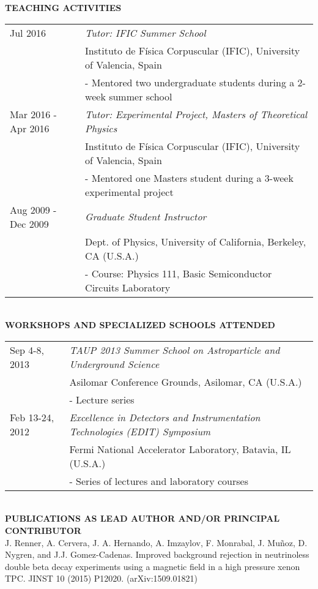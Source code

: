 \newpage
{\noindent\textbf{TEACHING ACTIVITIES}}\\

\begin{tabular}{ll}
	
	Jul 2016 & \emph{Tutor: IFIC Summer School}\\
	& Instituto de F\'{i}sica Corpuscular (IFIC), University of Valencia, Spain\\
	& - Mentored two undergraduate students during a 2-week summer school\\
	
	Mar 2016 - Apr 2016 & \emph{Tutor: Experimental Project, Masters of Theoretical Physics}\\
	& Instituto de F\'{i}sica Corpuscular (IFIC), University of Valencia, Spain\\
	& - Mentored one Masters student during a 3-week experimental project\\
		
	Aug 2009 - Dec 2009 & \emph{Graduate Student Instructor}\\
	& Dept. of Physics, University of California, Berkeley, CA (U.S.A.)\\
	& - Course: Physics 111, Basic Semiconductor Circuits Laboratory\\
\end{tabular}\\

{\noindent\textbf{WORKSHOPS AND SPECIALIZED SCHOOLS ATTENDED}}\\

\begin{tabular}{ll}
	Sep 4-8, 2013 & \emph{TAUP 2013 Summer School on Astroparticle and Underground Science}\\
	& Asilomar Conference Grounds, Asilomar, CA (U.S.A.)\\
	& - Lecture series\\
	
	Feb 13-24, 2012 & \emph{Excellence in Detectors and Instrumentation Technologies (EDIT) Symposium}\\
	& Fermi National Accelerator Laboratory, Batavia, IL (U.S.A.)\\
	& - Series of lectures and laboratory courses
\end{tabular}\\

\noindent \textbf{PUBLICATIONS AS LEAD AUTHOR AND/OR PRINCIPAL CONTRIBUTOR}\\

\noindent J. Renner, A. Cervera, J. A. Hernando, A. Imzaylov, F. Monrabal, J. Mu\~noz, D. Nygren, and J.J. Gomez-Cadenas.  Improved background rejection in neutrinoless double beta decay experiments using a magnetic field in a high pressure xenon TPC.  JINST 10 (2015) P12020. (arXiv:1509.01821)\\

